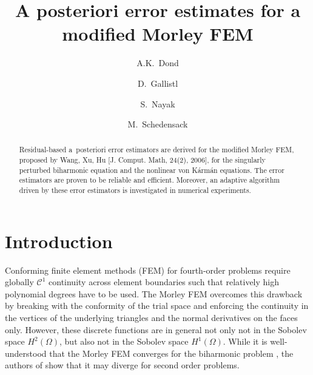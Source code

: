 \documentclass[a4paper]{amsart}
\title{A posteriori error estimates for a modified Morley FEM}
\author{A.K.~Dond}
\author{D.~Gallistl}
\author{S.~Nayak}
\author{M.~Schedensack}
\date{}%
\theoremstyle{definition}
\numberwithin{equation}{section}
\numberwithin{theorem}{section}
\begin{document}
\begin{abstract}
Residual-based a~posteriori error estimators are derived for the 
modified Morley FEM, proposed by Wang, Xu, Hu 
[J. Comput. Math, 24(2), 2006],
for the singularly perturbed biharmonic equation and the nonlinear 
von K\'arm\'an equations. The error estimators are proven to be
reliable and efficient. Moreover, an adaptive algorithm 
driven by these error estimators is investigated in numerical
experiments.
\end{abstract}



 


\maketitle

\section{Introduction}

Conforming finite element methods (FEM) for fourth-order 
problems require globally $\mathcal{C}^1$ continuity across 
element boundaries such that relatively high polynomial 
degrees have to be used. 
The Morley FEM  \cite{Morley1968} overcomes this drawback
by breaking with the conformity of the trial space
and enforcing the continuity in the vertices of the 
underlying triangles and the normal derivatives on the 
faces only. However, these discrete functions are in 
general not only not in the Sobolev space $H^2(\Omega)$,
but also not in the Sobolev space $H^1(\Omega)$.
While it is well-understood that the Morley FEM 
converges for the biharmonic problem \cite{Ciarlet1978,Gudi2010},
the authors of \cite{NilssenTaiWinther2001} show 
that it may diverge for second order problems.
\end{document}
